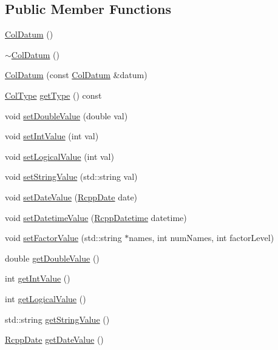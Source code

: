 \subsection*{Public Member Functions}
\begin{CompactItemize}
\item 
\hyperlink{classColDatum_b0aa09b7e8d9acd2b0435b256c6b4da7}{ColDatum} ()
\item 
\hyperlink{classColDatum_ccc1e3ec9da32643bd4953f983165b64}{$\sim$ColDatum} ()
\item 
\hyperlink{classColDatum_0507c6e2b4c76ee5364af001855fbe4e}{ColDatum} (const \hyperlink{classColDatum}{ColDatum} \&datum)
\item 
\hyperlink{Rcpp_8h_3145f0ed02782c5b592881e0e8e53655}{ColType} \hyperlink{classColDatum_ae862d41617b3ae39f88b5b729ccccc3}{getType} () const 
\item 
void \hyperlink{classColDatum_edf3ac3ea399222524f02f3468ec97a0}{setDoubleValue} (double val)
\item 
void \hyperlink{classColDatum_80d401e1efb6e714113990c78e72eb84}{setIntValue} (int val)
\item 
void \hyperlink{classColDatum_19ebd9c0e3e2544c8679999ab91c9e20}{setLogicalValue} (int val)
\item 
void \hyperlink{classColDatum_a87060ae6c415167d501c41684d8a586}{setStringValue} (std::string val)
\item 
void \hyperlink{classColDatum_988defa165f1d5ab7cde96d2c86c7c69}{setDateValue} (\hyperlink{classRcppDate}{RcppDate} date)
\item 
void \hyperlink{classColDatum_5803eb7a89dc467b88d7d412462c6fb5}{setDatetimeValue} (\hyperlink{classRcppDatetime}{RcppDatetime} datetime)
\item 
void \hyperlink{classColDatum_bd6f582044692c2215d9cd4add379ea1}{setFactorValue} (std::string $\ast$names, int numNames, int factorLevel)
\item 
double \hyperlink{classColDatum_6a19044be8ade2b14b372b179210a9bd}{getDoubleValue} ()
\item 
int \hyperlink{classColDatum_f498266608526c9db7f865bc66cc5e40}{getIntValue} ()
\item 
int \hyperlink{classColDatum_df81b2aed6f8e19b6f36310288991f38}{getLogicalValue} ()
\item 
std::string \hyperlink{classColDatum_d0d76d861441151f31cf42acff4b8c0f}{getStringValue} ()
\item 
\hyperlink{classRcppDate}{RcppDate} \hyperlink{classColDatum_70480f53f9cee46bcdaed7331e38c943}{getDateValue} ()

\end{CompactItemize}
